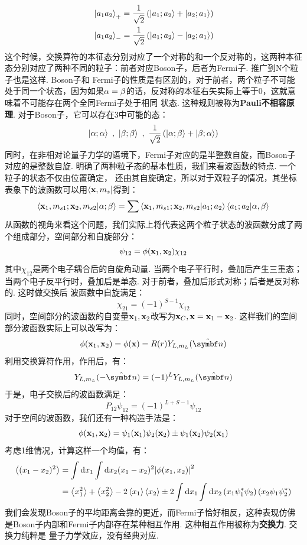 \begin{align*}
& \ket{a_{1}a_{2}}_{+} = \frac{1}{\sqrt{2}}\left({\ket{a_{1};a_{2}} + \ket{a_{2};a_{1}}}\right) \\
& \ket{a_{1}a_{2}}_{-} = \frac{1}{\sqrt{2}}\left({\ket{a_{1};a_{2}} - \ket{a_{2};a_{1}}}\right)
\end{align*}
这个时候，交换算符的本征态分别对应了一个对称的和一个反对称的，这两种本征态分别对应了两种不同的粒子：前者对应Boson子，后者为Fermi子. 推广到N个粒子也是这样. Boson子和
Fermi子的性质是有区别的，对于前者，两个粒子不可能处于同一个状态，因为如果\(\alpha=\beta\)的话，反对称的本征右矢实际上等于\(0\)，这就意味着不可能存在两个全同Fermi子处于相同
状态. 这种规则被称为\textbf{Pauli不相容原理}. 对于Boson子，它可以存在3中可能的态：
\[
\ket{\al;\al}\ , \ \ket{\be;\be}\ , \ \frac{1}{\sqrt{2}}\br{\ket{\al;\be}+\ket{\be;\al}}
\]
同时，在非相对论量子力学的语境下，Fermi子对应的是半整数自旋，而Boson子对应的是整数自旋. 明确了两种粒子态的基本性质，我们来看波函数的特点. 一个粒子的状态不仅由位置确定，
还由其自旋确定，所以对于双粒子的情况，其坐标表象下的波函数可以用\(\bra{\mathbf{x},m_{s}}\)得到：
\[
\bra{\mathbf{x}_{1},m_{s1};\mathbf{x}_{2},m_{s2}}\ket{\alpha;\beta} = \sum\bra{\mathbf{x}_{1},m_{s1};\mathbf{x}_{2},m_{s2}}\ket{a_{1};a_{2}}\bra{a_{1};a_{2}}\ket{\alpha,\beta}
\]
从函数的视角来看这个问题，我们实际上将代表这两个粒子状态的波函数分成了两个组成部分，空间部分和自旋部分：
\[
\psi_{12} = \phi(\mathbf{x}_{1},\mathbf{x}_{2})\chi_{12}
\]
其中\(\chi_{12}\)是两个电子耦合后的自旋角动量. 当两个电子平行时，叠加后产生三重态；当两个电子反平行时，叠加后是单态. 对于前者，叠加后形式对称；后者是反对称的. 这时做交换后
波函数中自旋满足：
\[
\chi_{21} = (-1)^{S-1}\chi_{12}
\]
同时，空间部分的波函数的自变量\(\mathbf{x}_{1},\mathbf{x}_{2}\)改写为\(\mathbf{x}_{C},\mathbf{x}=\mathbf{x}_{1}-\mathbf{x}_{2}\). 这样我们的空间部分波函数实际上可以改写为：
\[
\phi(\vr_{1},\vr_{2}) = \phi(\vr) = \Rcal(r)Y_{L,m_{L}}(\uv{n})
\]
利用交换算符作用，作用后，有：
\[
Y_{L,m_{L}}(-\uv{n}) = (-1)^{L}Y_{L,m_{L}}(\uv{n})
\]
于是，电子交换后的波函数满足：
\[
P_{12}\psi_{12} = (-1)^{L+S-1}\psi_{12}
\]
对于空间的波函数，我们还有一种构造手法是：
\[
\phi(\mathbf{x}_{1},\mathbf{x}_{2}) = \psi_{1}(\mathbf{x}_{1})\psi_{2}(\mathbf{x}_{2}) \pm \psi_{1}(\mathbf{x}_{2})\psi_{2}(\mathbf{x}_{1})
\]
考虑1维情况，计算这样一个均值，有：
\begin{align*}
\left\langle{(x_{1}-x_{2})^{2}}\right\rangle
& = \int\dd x_{1}\int\dd x_{2}(x_{1} - x_{2})^{2}\abs{\phi(x_{1},x_{2})}^{2} \\
& = \left\langle{x_{1}^{2}}\right\rangle + \left\langle{x_{2}^{2}}\right\rangle-2\left\langle{x_{1}}\right\rangle\left\langle{x_{2}}\right\rangle\pm2\int\dd{x}_{1}\int\dd{x}_{2}\left({x_{1}\psi_{1}^{*}\psi_{2}}\right)\left({x_{2}\psi_{1}\psi^{*}_{2}}\right)
\end{align*}
我们会发现Boson子的平均距离会靠的更近，而Fermi子恰好相反，这种表现仿佛是Boson子内部和Fermi子内部存在某种相互作用. 这种相互作用被称为\textbf{交换力}. 交换力纯粹是
量子力学效应，没有经典对应. 